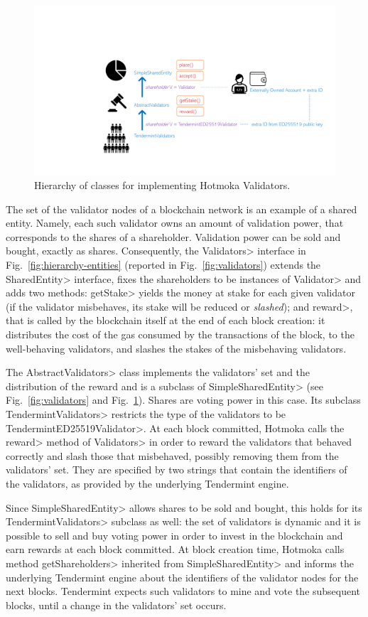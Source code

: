 \begin{figure}[ht]
\centering
\includegraphics[width=0.8\linewidth]{figures/takamaka_validators}
\caption{Hierarchy of classes for implementing Hotmoka Validators.}
\label{figure.takamaka_validators}
\end{figure}

The set of the validator nodes of a blockchain network is an example of a shared entity.
Namely, each such validator owns an amount of validation power, that corresponds to the shares
of a shareholder. Validation power can be sold and bought, exactly as shares.
Consequently, the \<Validators> interface in Fig.~\ref{fig:hierarchy-entities}
(reported in Fig.~\ref{fig:validators})
extends the \<SharedEntity> interface, fixes the shareholders to be
instances of \<Validator> and adds two methods: \<getStake> yields the money
at stake for each given validator (if the validator misbehaves, its stake will be reduced or
\emph{slashed}); and \<reward>, that is called by the blockchain itself at the end of each
block creation: it distributes the cost of the gas consumed by the transactions of the block,
to the well-behaving validators, and slashes the stakes of the misbehaving validators.

The \<AbstractValidators> class implements the validators' set
and the distribution of the reward and is a subclass of \<SimpleSharedEntity>
(see Fig.~\ref{fig:validators} and Fig.~\ref{figure.takamaka_validators}).
Shares are voting power in this case.
Its subclass \<TendermintValidators> restricts the type of the validators
to be \<TendermintED25519Validator>.
At each block committed, Hotmoka calls the \<reward> method of \<Validators>
in order to reward the validators that behaved correctly
and slash those that misbehaved, possibly removing them from the validators' set.
They are specified by two strings
that contain the identifiers of the validators, as provided by the underlying
Tendermint engine.

Since \<SimpleSharedEntity> allows shares to be sold and bought, this holds for
its \<TendermintValidators> subclass as well: the set of validators
is dynamic and it is possible to sell and buy voting power in order to invest in the blockchain
and earn rewards at each block committed. At block creation time,
Hotmoka calls method \<getShareholders> inherited from
\<SimpleSharedEntity> and informs the
underlying Tendermint engine about the identifiers of the validator nodes for the next blocks.
Tendermint expects such validators to mine and vote the subsequent blocks, until a change in the
validators' set occurs.

